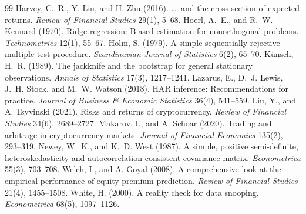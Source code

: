 \documentclass[11pt]{article}
\begin{document}
\begin{thebibliography}{99}
 Harvey, C.~R., Y. Liu, and H. Zhu (2016). \ldots\ and the cross-section of expected returns. \emph{Review of Financial Studies} 29(1), 5--68.
 Hoerl, A.~E., and R.~W. Kennard (1970). Ridge regression: Biased estimation for nonorthogonal problems. \emph{Technometrics} 12(1), 55--67.
 Holm, S. (1979). A simple sequentially rejective multiple test procedure. \emph{Scandinavian Journal of Statistics} 6(2), 65--70.
 K\"unsch, H.~R. (1989). The jackknife and the bootstrap for general stationary observations. \emph{Annals of Statistics} 17(3), 1217--1241.
 Lazarus, E., D.~J. Lewis, J.~H. Stock, and M.~W. Watson (2018). HAR inference: Recommendations for practice. \emph{Journal of Business \& Economic Statistics} 36(4), 541--559.
 Liu, Y., and A. Tsyvinski (2021). Risks and returns of cryptocurrency. \emph{Review of Financial Studies} 34(6), 2689--2727.
 Makarov, I., and A. Schoar (2020). Trading and arbitrage in cryptocurrency markets. \emph{Journal of Financial Economics} 135(2), 293--319.
 Newey, W.~K., and K.~D. West (1987). A simple, positive semi-definite, heteroskedasticity and autocorrelation consistent covariance matrix. \emph{Econometrica} 55(3), 703--708.
 Welch, I., and A. Goyal (2008). A comprehensive look at the empirical performance of equity premium prediction. \emph{Review of Financial Studies} 21(4), 1455--1508.
 White, H. (2000). A reality check for data snooping. \emph{Econometrica} 68(5), 1097--1126.
\end{thebibliography}
\end{document}
